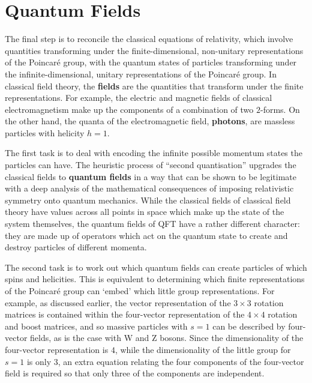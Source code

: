 \documentclass[12pt]{article}
\begin{document}
\section{Quantum Fields}

The final step is to reconcile the classical equations of relativity, which involve quantities transforming under the finite-dimensional, non-unitary representations of the Poincaré group, with the quantum states of particles transforming under the infinite-dimensional, unitary representations of the Poincaré group. In classical field theory, the \textbf{fields} are the quantities that transform under the finite representations. For example, the electric and magnetic fields of classical electromagnetism make up the components of a combination of two $2$-forms. On the other hand, the quanta of the electromagnetic field, \textbf{photons}, are massless particles with helicity $h=1$.
\newline

The first task is to deal with encoding the infinite possible momentum states the particles can have. The heuristic process of ``second quantisation'' upgrades the classical fields to \textbf{quantum fields} in a way that can be shown to be legitimate with a deep analysis of the mathematical consequences of imposing relativistic symmetry onto quantum mechanics. While the classical fields of classical field theory have values across all points in space which make up the state of the system themselves, the quantum fields of QFT have a rather different character: they are made up of operators which act on the quantum state to create and destroy particles of different momenta.
\newline

The second task is to work out which quantum fields can create particles of which spins and helicities. This is equivalent to determining which finite representations of the Poincaré group can `embed' which little group representations. For example, as discussed earlier, the vector representation of the $3 \times 3$ rotation matrices is contained within the four-vector representation of the $4 \times 4$ rotation and boost matrices, and so massive particles with $s=1$ can be described by four-vector fields, as is the case with W and Z bosons. Since the dimensionality of the four-vector representation is $4$, while the dimensionality of the little group for $s=1$ is only $3$, an extra equation relating the four components of the four-vector field is required so that only three of the components are independent.
\newline
\end{document}
